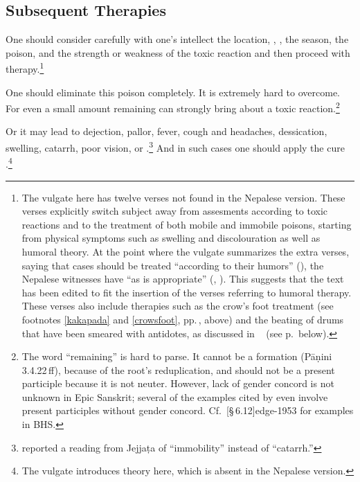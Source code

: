 \begin{translation}
\subsection{Subsequent Therapies}

\item[34]

One should consider carefully with one's intellect the location,
, , the season, the
poison, and the strength or weakness of the toxic reaction and then
proceed with therapy.\footnote{The vulgate here has twelve verses not
    found in the Nepalese version.  These verses explicitly switch subject
    away from assesments according to toxic reactions and to the treatment of
    both mobile and immobile poisons, starting from physical symptoms such as
    swelling and discolouration as well as humoral theory. At the point where
    the vulgate summarizes the extra verses, saying that cases should be
    treated “according to their humors” (), the Nepalese
    witnesses have “as is appropriate” (,
    ).  This suggests that the text has been edited to fit
    the insertion of the verses referring to humoral therapy.  These verses also 
    include therapies such as the crow's foot treatment (see footnotes
    \ref{kakapada} and \ref{crowsfoot}, pp.\,\pageref{kakapada}, 
    \pageref{crowsfoot} above) and the beating of drums 
    that have been smeared with antidotes, as discussed in \SS\ 
     (see p.\,\pageref{dundubhi} below).}

\item [47--48ab] One should eliminate this poison completely.  It is
extremely hard to overcome. For even a small amount remaining can
strongly bring about a toxic reaction.\footnote{The word
     “remaining” is hard to parse.  It cannot be a
    \dev{ṇamul} formation (Pāṇini 3.4.22\,ff), because of the root's
    reduplication, and should not be a present participle because it is
    not neuter.  However, lack of gender concord is not unknown in Epic
    Sanskrit; several of the examples cited by
    \citet[\S\,10.2.1]{ober-2003} even involve present participles without
    gender concord. Cf.\ \volcite{1}[\S\,6.12]{edge-1953} for examples in
    BHS.}

\item[48cd--49] Or it may lead to dejection, pallor, fever, cough and
headaches, dessication, swelling, catarrh, poor vision,
 or
.\footnote{ reported
    a reading from Jejjaṭa of \dev{staimitya} “immobility” instead of
    \dev{pratiśyāya} “catarrh.”} And in such cases one should apply the cure
    \diff{as appropriate}.\footnote{The vulgate introduces \dev{doṣa} theory
        here, which is absent in the Nepalese version.}


\end{translation}
